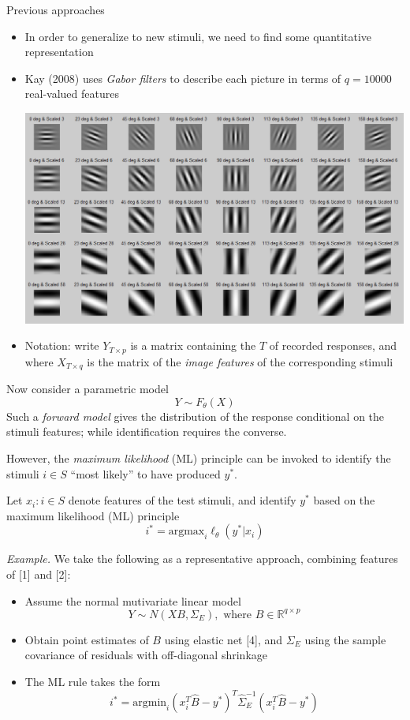 \documentclass[final]{beamer}
\newlength{\onecolwid}
\begin{document}
\begin{frame}[t]
\begin{columns}[t]
\begin{column}{\onecolwid}
\begin{block}{Previous approaches}
\begin{itemize}
\item In order to generalize to new stimuli, we need to find some quantitative representation
\item Kay (2008) uses \emph{Gabor filters} to describe each picture in terms of $q = 10000$ real-valued features
\begin{center}\includegraphics[scale = 0.7, trim = 0in 2.5in 0in 0in, clip]{gabor.png}
\end{center}
\item Notation: write $Y_{T \times p}$ is a matrix containing the $T$ of recorded responses, and
where $X_{T \times q}$ is the matrix of the \emph{image features} of the corresponding stimuli
\end{itemize}

Now consider a parametric model
\[
Y \sim F_\theta(X)
\]
Such a \emph{forward model} gives the distribution of the
response conditional on the stimuli features;
while identification requires the converse.

However, the \emph{maximum likelihood} (ML) principle can be invoked to
identify the stimuli $i \in S$ ``most likely'' to have produced $y^*$.

Let $x_i : i \in S$ denote features of the test stimuli, and
identify $y^*$ based on the maximum likelihood (ML) principle
\[
i^* = \text{argmax}_i \ell_\theta(y^*| x_i)
\]

\emph{Example.} We take the following as a representative approach, combining features of [1] and [2]:
\begin{itemize}
\item Assume the normal mutivariate linear model
\[Y \sim N( XB , \Sigma_E), \text{ where }B \in \mathbb{R}^{q \times p}\]
\item Obtain point estimates of $B$ using elastic net [4], and $\Sigma_E$ using the sample covariance of residuals with off-diagonal shrinkage
\item The ML rule takes the form
\[
i^* = \text{argmin}_{i} (x_i^T \hat{B} - y^*)^T \hat{\Sigma}_E^{-1} (x_i^T \hat{B} - y^*)
\]
\end{itemize}
\end{block}


\end{column}
\end{columns}
\end{frame}
\end{document}
